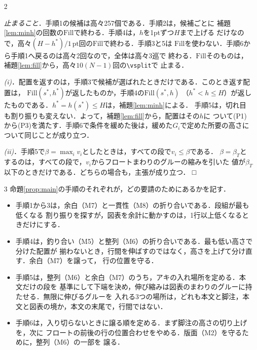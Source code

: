 \documentclass[paper=a4,fontsize=10pt]{jlreq}
\newcommand\cs[1]{\texttt{\textbackslash #1}}
\newcommand\kyocho[1]{{\gtfamily\itshape #1}}
\newenvironment{shoumei}{%
  \par\noindent{\gtfamily\sffamily 証明}\hspace{1\zw}\ignorespaces}
  {\unskip\nobreak\hfill □\par\addvspace{.5\baselineskip}}
\newcommand\komidashi[1]{\par\addvspace{.5\baselineskip}%
  \noindent{\gtfamily\sffamily #1}\hspace{1\zw}\ignorespaces}
\begin{document}
\begin{multicols}{2}
\begin{shoumei}
\kyocho{止まること}．手順1の候補は高々257個である．手順2は，候補ごとに
補題\ref{lem:minh}の回数の$\mathrm{Fill}$で終わる．手順4は，$h$を1ptずつ$H$まで上げる
だけなので，高々$(H-h^*)/1\,\mathrm{pt}$回の$\mathrm{Fill}$で終わる．手順3と5は
$\mathrm{Fill}$を使わない．手順6から手順1へ戻るのは高々2回なので，全体は高々3巡で
終わる．$\mathrm{Fill}$そのものは，補題\ref{lem:fill}から，高々$10(N-1)$回の\cs{vsplit}で
止まる．

\kyocho{(i)}．配置を返すのは，手順3で候補が選ばれたときだけである．このとき返す配置は，
$\mathrm{Fill}(s^*,h^*)$が返したものか，手順4の$\mathrm{Fill}(s^*,h)$
（$h^*<h\le H$）が返したものである．$h^*=h(s^*)\le H$は，補題\ref{lem:minh}による．
手順5は，切れ目も割り振りも変えない．よって，補題\ref{lem:fill}から，配置はその$h$に
ついて(P1)から(P3)を満たす．手順6で条件を緩めた後は，緩めた$G_i$で定めた所要の高さに
ついて同じことが成り立つ．

\kyocho{(ii)}．手順5で$\beta=\max_i v_i$としたときは，すべての段で$v_i\le\beta$である．
$\beta=\beta_T$とするのは，すべての段で，$v_i$からフロートまわりのグルーの縮みを引いた
値が$\beta_T$以下のときだけである．どちらの場合も，主張が成り立つ．
\end{shoumei}
\end{multicols}

\komidashi{手順と要請の対応}
\begin{evenendmulticols}[columnsep=2.5\zw,columnseprule=.4pt]{3}
命題\ref{prop:main}の手順のそれぞれが，どの要請のためにあるかを記す．
\begin{itemize}
  \item 手順1から3は，余白（M7）と一貫性（M8）の折り合いである．段組が最も低くなる
    割り振りを探すが，図表を余計に動かすのは，1行以上低くなるときだけにする．
  \item 手順4は，釣り合い（M5）と整列（M6）の折り合いである．最も低い高さで分けた配置が
    揃わないとき，行間を伸ばすのではなく，高さを上げて分け直す．余白（M7）を譲って，
    行の位置を守る．
  \item 手順5は，整列（M6）と余白（M7）のうち，アキの入れ場所を定める．本文だけの段を
    基準にして下端を決め，伸び縮みは図表のまわりのグルーに持たせる．無限に伸びるグルーを
    入れる3つの場所は，どれも本文と脚注，本文と図表の境か，本文の末尾で，行間ではない．
  \item 手順6は，入り切らないときに譲る順を定める．まず脚注の高さの切り上げを，次に
    フロートの前後の行の位置合わせをやめる．版面（M2）を守るために，整列（M6）の一部を
    譲る．
\end{itemize}
\end{evenendmulticols}
\end{document}
